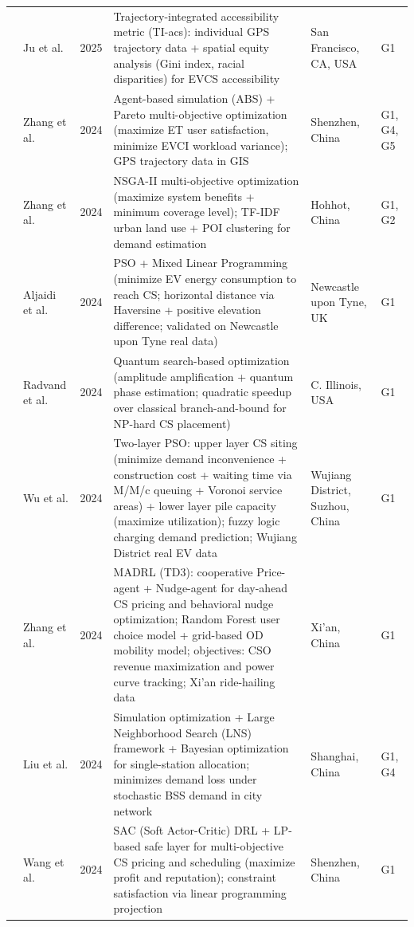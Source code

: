 \documentclass[letterpaper, 12pt, oneside, doublespacing]{Thesis}
\begin{document}
\begin{longtable}{L{0.9cm} L{2.2cm} L{0.8cm} L{3.3cm} L{2.5cm} L{1.5cm}}
\cite{trajectory-integrated_accessibility_2025} & Ju et al. & 2025 & Trajectory-integrated accessibility metric (TI-acs): individual GPS trajectory data + spatial equity analysis (Gini index, racial disparities) for EVCS accessibility & San Francisco, CA, USA & G1 \\
\cite{a_data-driven_2024} & Zhang et al. & 2024 & Agent-based simulation (ABS) + Pareto multi-objective optimization (maximize ET user satisfaction, minimize EVCI workload variance); GPS trajectory data in GIS & Shenzhen, China & G1, G4, G5 \\
\cite{a_multi-objective_2024} & Zhang et al. & 2024 & NSGA-II multi-objective optimization (maximize system benefits + minimum coverage level); TF-IDF urban land use + POI clustering for demand estimation & Hohhot, China & G1, G2 \\
\cite{a_particle_2024} & Aljaidi et al. & 2024 & PSO + Mixed Linear Programming (minimize EV energy consumption to reach CS; horizontal distance via Haversine + positive elevation difference; validated on Newcastle upon Tyne real data) & Newcastle upon Tyne, UK & G1 \\
\cite{a_quantum_2024} & Radvand et al. & 2024 & Quantum search-based optimization (amplitude amplification + quantum phase estimation; quadratic speedup over classical branch-and-bound for NP-hard CS placement) & C. Illinois, USA & G1 \\
\cite{a_two-layer_2024} & Wu et al. & 2024 & Two-layer PSO: upper layer CS siting (minimize demand inconvenience + construction cost + waiting time via M/M/c queuing + Voronoi service areas) + lower layer pile capacity (maximize utilization); fuzzy logic charging demand prediction; Wujiang District real EV data & Wujiang District, Suzhou, China & G1 \\
\cite{advancing_urban_2024} & Zhang et al. & 2024 & MADRL (TD3): cooperative Price-agent + Nudge-agent for day-ahead CS pricing and behavioral nudge optimization; Random Forest user choice model + grid-based OD mobility model; objectives: CSO revenue maximization and power curve tracking; Xi'an ride-hailing data & Xi'an, China & G1 \\
\cite{battery_swapping_2024} & Liu et al. & 2024 & Simulation optimization + Large Neighborhood Search (LNS) framework + Bayesian optimization for single-station allocation; minimizes demand loss under stochastic BSS demand in city network & Shanghai, China & G1, G4 \\
\cite{beyond_profit_2024} & Wang et al. & 2024 & SAC (Soft Actor-Critic) DRL + LP-based safe layer for multi-objective CS pricing and scheduling (maximize profit and reputation); constraint satisfaction via linear programming projection & Shenzhen, China & G1 \\

\end{longtable}
\end{document}
